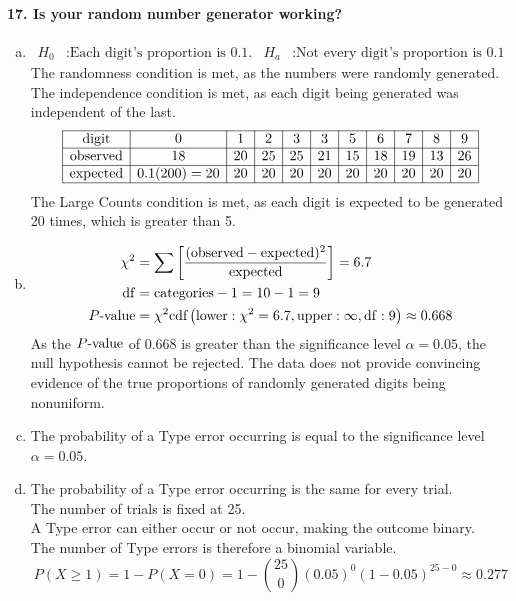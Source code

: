 \documentclass[../Homework]{subfiles}
\begin{document}
		\paragraph{17. Is your random number generator working?}
			\begin{enumerate}[a.]
				\item
					\begin{align*}
						H_0&: \text{Each digit's proportion is 0.1.} & H_a&: \text{Not every digit's proportion is 0.1}
					\end{align*}
					The randomness condition is met, as the numbers were randomly generated. \\
					The independence condition is met, as each digit being generated was independent of the last. \\
					\[\begin{array}{|c|c|c|c|c|c|c|c|c|c|c|}\hline
						\text{digit} & 0 & 1 & 2 & 3 & 3 & 5 & 6 & 7 & 8 & 9 \\\hline
						\text{observed} & 18 & 20 & 25 & 25 & 21 & 15 & 18 & 19 & 13 & 26 \\\hline
						\text{expected} & 0.1(200) = 20 & 20 & 20 & 20 & 20 & 20 & 20 & 20 & 20 & 20 \\\hline
					\end{array}\]
					The Large Counts condition is met, as each digit is expected to be generated 20 times, which is greater than 5.
				\item
					\begin{align*}
						\chi^2 &= \sum\left[\mathrm{\frac{(observed - expected)^2}{expected}}\right] = 6.7 \\
						\operatorname{df} &= \text{categories} - 1 = 10 - 1 = 9 \\
						P\text{-value} &= \chi^2\text{cdf}\left(\operatorname{lower}: \chi^2 = 6.7, \operatorname{upper}: \infty, \operatorname{df}: 9\right) \approx 0.668
					\end{align*}
					As the $P\text{-value}$ of 0.668 is greater than the significance level $\alpha = 0.05$, the null hypothesis cannot be rejected. The data does not provide convincing evidence of the true proportions of randomly generated digits being nonuniform. \\
				\item
					The probability of a Type  error occurring is equal to the significance level $\alpha = 0.05$. \\
				\item
					The probability of a Type  error occurring is the same for every trial. \\
					The number of trials is fixed at 25. \\
					A Type  error can either occur or not occur, making the outcome binary. \\
					The number of Type  errors is therefore a binomial variable.
					\[P(X \ge 1) = 1 - P(X = 0) = 1 - \binom{25}{0}(0.05)^0(1 - 0.05)^{25 - 0} \approx 0.277\]
			\end{enumerate}
\end{document}
